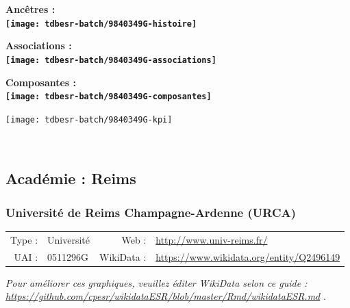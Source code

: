 \documentclass[12pt,french,]{article}
\begin{document}
\vspace{1cm}  
\begin{minipage}[b]{0.50\textwidth}\begin{center} \bf Ancêtres : \\  
\texttt{[image: tdbesr-batch/9840349G-histoire]} \end{center}\end{minipage}\begin{minipage}[b]{0.50\textwidth}\begin{center} \bf Associations : \\  
\texttt{[image: tdbesr-batch/9840349G-associations]} \end{center}\end{minipage}

\hrulefill

\begin{center} \bf Composantes : \\  
\texttt{[image: tdbesr-batch/9840349G-composantes]} \end{center}

\begin{center}\texttt{[image: tdbesr-batch/9840349G-kpi]} \end{center}\checkoddpage

\ifoddpage \fi ~\newpage  

\hypertarget{acaduxe9mie-reims}{%
\subsection{Académie : Reims}\label{acaduxe9mie-reims}}

\hypertarget{universituxe9-de-reims-champagne-ardenne-urca}{%
\subsubsection{Université de Reims Champagne-Ardenne
(URCA)}\label{universituxe9-de-reims-champagne-ardenne-urca}}

\begin{tabular*}{\textwidth}{rp{5cm}rl}  
\hline  
Type : & Université & Web : &\href{http://www.univ-reims.fr/}{http://www.univ-reims.fr/} \\  
UAI : & 0511296G & WikiData : & \href{https://www.wikidata.org/entity/Q2496149}{https://www.wikidata.org/entity/Q2496149} \\  
\hline  
\end{tabular*}

\textit{\scriptsize Pour améliorer ces graphiques, veuillez éditer WikiData selon ce guide :  \href{https://github.com/cpesr/wikidataESR/blob/master/Rmd/wikidataESR.md}{https://github.com/cpesr/wikidataESR/blob/master/Rmd/wikidataESR.md}}
.
\end{document}

